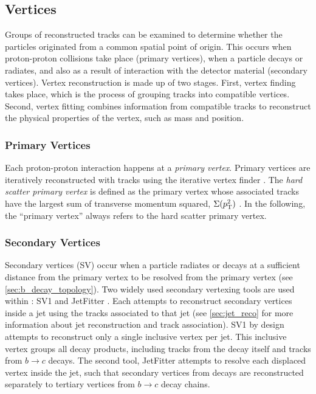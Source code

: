 \subsection{Vertices}\label{sec:vertex_reco}
Groups of reconstructed tracks can be examined to determine whether the particles originated from a common spatial point of origin.
This occurs when proton-proton collisions take place (primary vertices), when a particle decays or radiates, and also as a result of interaction with the detector material (secondary vertices).
Vertex reconstruction is made up of two stages.
First, vertex finding takes place, which is the process of grouping tracks into compatible vertices.
Second, vertex fitting combines information from compatible tracks to reconstruct the physical properties of the vertex, such as mass and position.

\subsubsection{Primary Vertices}
Each proton-proton interaction happens at a \textit{primary vertex}.
Primary vertices are iteratively reconstructed with tracks using the iterative vertex finder \cite{PERF-2015-01}.
The \textit{hard scatter primary vertex} is defined as the primary vertex whose associated tracks have the largest sum of transverse momentum squared, $\Sigma(p_{\text{T}}^2)$ \cite{ATL-PHYS-PUB-2015-026}.
In the following, the ``primary vertex'' always refers to the hard scatter primary vertex.

\subsubsection{Secondary Vertices}
Secondary vertices (SV) occur when a particle radiates or decays at a sufficient distance from the primary vertex to be resolved from the primary vertex (see \cref{sec:b_decay_topology}).
Two widely used secondary vertexing tools are used within \ATLAS: SV1 and JetFitter \cite{FTAG-2018-01,ATL-PHYS-PUB-2017-011}.
Each attempts to reconstruct secondary vertices inside a jet using the tracks associated to that jet (see \cref{sec:jet_reco} for more information about jet reconstruction and track association).
SV1 by design attempts to reconstruct only a single inclusive vertex per jet.
This inclusive vertex groups all \bhadron decay products, including tracks from the \bhadron decay itself and tracks from $b \rightarrow c$ decays.
The second tool, JetFitter attempts to resolve each displaced vertex inside the jet, such that secondary vertices from \bhadron decays are reconstructed separately to tertiary vertices from $b \rightarrow c$ decay chains.


